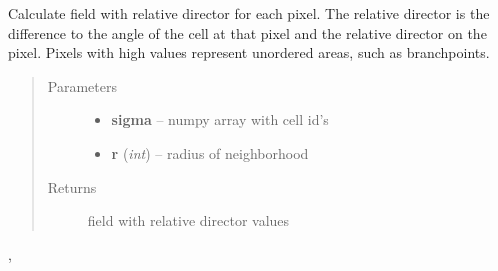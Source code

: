 \documentclass[letterpaper,10pt,english]{sphinxmanual}
\begin{document}

\begin{fulllineitems}
\label{AnalysisUtils:AnalysisUtils.getRelativeDirField}
Calculate field with relative director for each pixel. The relative director is the difference to the angle of the cell at that pixel and the relative director on the pixel. Pixels with high values represent unordered areas, such as branchpoints.
\begin{quote}\begin{description}
\item[{Parameters}] \leavevmode\begin{itemize}
\item {} 
\textbf{sigma} -- numpy array with cell id's

\item {} 
\textbf{r} (\emph{int}) -- radius of neighborhood

\end{itemize}

\item[{Returns}] \leavevmode
field with relative director values

\end{description}\end{quote}




{\hyperref[AnalysisUtils:AnalysisUtils.getDirector]{}}, {\hyperref[AnalysisUtils:AnalysisUtils.getAngleField]{}}



\end{fulllineitems}
\end{document}

